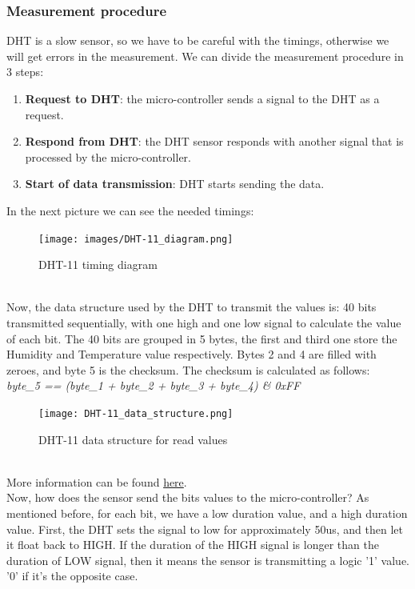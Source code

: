 \documentclass[14pt]{article}
\begin{document}
\begin{normalsize}
				\subsubsection{Measurement procedure}
				DHT is a slow sensor, so we have to be careful with the timings, otherwise we will get errors in the measurement. We can divide the measurement procedure in 3 steps:
				\begin{enumerate}
					\item \textbf{Request to DHT}: the micro-controller sends a signal to the DHT as a request.
					\item \textbf{Respond from DHT}: the DHT sensor responds with another signal that is processed by the micro-controller.
					\item \textbf{Start of data transmission}: DHT starts sending the data.
				\end{enumerate}
				In the next picture we can see the needed timings:
				\begin{figure}[h]
					\centering
					\texttt{[image: images/DHT-11\_diagram.png]}
					\caption{DHT-11 timing diagram}
				\end{figure}\\
				Now, the data structure used by the DHT to transmit the values is: 40 bits transmitted sequentially, with one high and one low signal to calculate the value of each bit. The 40 bits are grouped in 5 bytes, the first and third one store the Humidity and Temperature value respectively. Bytes 2 and 4 are filled with zeroes, and byte 5 is the checksum. The checksum is calculated as follows: \vspace{5pt}\\\textit{byte\_5 == (byte\_1 + byte\_2 + byte\_3 + byte\_4) \& 0xFF}\vspace{-5pt}\\
				\begin{figure}[h]
					\centering
					\texttt{[image: DHT-11\_data\_structure.png]}
					\caption{DHT-11 data structure for read values}
				\end{figure}\\
				More information can be found \href{https://github.com/UncleRus/esp-idf-lib/blob/master/components/dht/dht.c}{here}.\\
				
				Now, how does the sensor send the bits values to the micro-controller? As mentioned before, for each bit, we have a low duration value, and a high duration value. First, the DHT sets the signal to low for approximately 50us, and then let it float back to HIGH. If the duration of the HIGH signal is longer than the duration of LOW signal, then it means the sensor is transmitting a logic '1' value. '0' if it's the opposite case. 

\end{normalsize}
\end{document}
